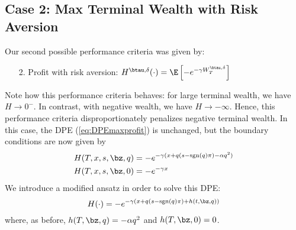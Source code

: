 \documentclass[12pt]{article}
\begin{document}
\subsection*{Case 2: Max Terminal Wealth with Risk Aversion}
Our second possible performance criteria was given by:
\begin{enumerate}[noitemsep, topsep=0pt]
\item[2.] Profit with risk aversion: $H^{\btau, \delta}(\cdot) = \E \left[ - e^{-\gamma W_T^{\btau, \delta}} \right] $
\end{enumerate}
Note how this performance criteria behaves: for large terminal wealth, we have $H \rightarrow 0^-$. In contrast, with negative wealth, we have $H \rightarrow -\infty$. Hence, this performance criteria disproportionately penalizes negative terminal wealth. In this case, the DPE (\ref{eq:DPEmaxprofit}) is unchanged, but the boundary conditions are now given by
\begin{subequations}
\begin{align}
H(T, x, s, \bz, q) & = -e^{-\gamma(x + q(s - \mathrm{sgn}(q)\pi) -\alpha q^2)} \\
H(T, x, s, \bz, 0) & = -e^{-\gamma x}
\end{align}
\end{subequations}
We introduce a modified ansatz in order to solve this DPE:
\begin{equation}
\label{eq:ansatzHcase2}
H(\cdot) = -e^{-\gamma(x + q(s - \mathrm{sgn}(q)\pi) + h(t,\bz,q))}
\end{equation}
where, as before, $h(T,\bz,q) = -\alpha q^2$ and $h(T,\bz,0) = 0$.
\end{document}
